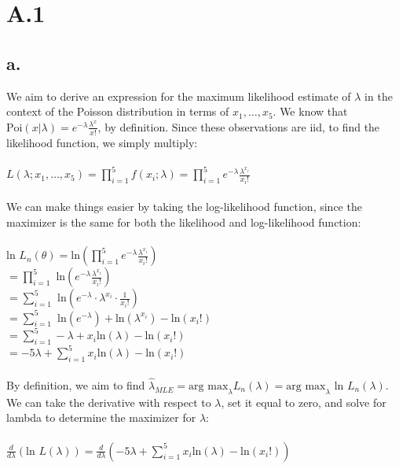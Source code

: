 \documentclass{article}
\newcommand{\1}{\mathbf{1}}
\begin{document}
\section*{A.1}
{\Large

\subsection*{a.}

We aim to derive an expression for the maximum likelihood estimate of $\lambda$ in the context of the Poisson distribution in terms of $x_1, \dots, x_5$. We know that $\text{Poi}(x|\lambda) = e^{-\lambda}\frac{\lambda ^x}{x!}$, by definition. Since these observations are iid, to find the likelihood function, we simply multiply: \\ \\
$L(\lambda; x_1, \dots, x_5) = \prod_{i=1}^{5} f(x_i;\lambda) = \prod_{i=1}^{5} e^{-\lambda} \frac{\lambda^{x_i}}{x_i!} $ \\ \\
We can make things easier by taking the log-likelihood function, since the maximizer is the same for both the likelihood and log-likelihood function: \\ \\
$\text{ln } L_n(\theta) = \text{ln} (\prod_{i=1}^{5} e^{-\lambda} \frac{\lambda^{x_i}}{x_i!}) $ \\
$= \prod_{i=1}^{5} \text{ ln}(e^{-\lambda} \frac{\lambda^{x_i}}{x_i!}) $ \\
$= \sum_{i=1}^{5} \text{ ln}(e^{-\lambda} \cdot \lambda^{x_i} \cdot \frac{1}{x_i!}) $ \\
$= \sum_{i=1}^{5} \text{ ln}(e^{-\lambda}) + \text{ln}(\lambda^{x_i}) - \text{ln}(x_i!) $ \\
$= \sum_{i=1}^{5} -\lambda + x_i\text{ln}(\lambda) - \text{ln}(x_i!) $ \\
$= -5\lambda + \sum_{i=1}^{5} x_i\text{ln}(\lambda) - \text{ln}(x_i!) $ \\ \\
By definition, we aim to find $\widehat{\lambda}_{MLE} = \text{arg max}_{\lambda}L_n(\lambda) = \text{arg max}_{\lambda} \text{ ln }L_n(\lambda)$. We can take the derivative with respect to $\lambda$, set it equal to zero, and solve for lambda to determine the maximizer for $\lambda$: \\ \\
$\frac{d}{d\lambda} (\text{ln } L(\lambda)) = \frac{d}{d\lambda} (-5\lambda + \sum_{i=1}^{5} x_i\text{ln}(\lambda) - \text{ln}(x_i!))$ \\
}
\end{document}
